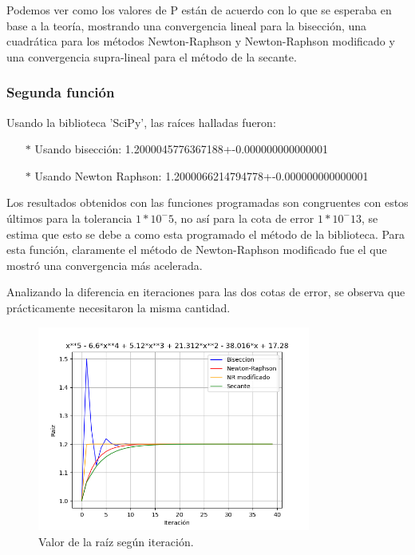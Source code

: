 \documentclass[titlepage,a4paper]{article}
\begin{document}
Podemos ver como los valores de P están de acuerdo con lo que se esperaba en base a la teoría, mostrando una convergencia lineal para la bisección, una cuadrática para los métodos Newton-Raphson y Newton-Raphson modificado y una convergencia supra-lineal para el método de la secante.

\subsubsection{Segunda función}\label{sec:CR2}

Usando la biblioteca 'SciPy', las raíces halladas fueron:
\begin{itemize}
    \item[$*$]Usando bisección:   1.2000045776367188+-0.000000000000001
    \item[$*$]Usando Newton Raphson:  1.2000066214794778+-0.000000000000001
\end{itemize}

Los resultados obtenidos con las funciones programadas son congruentes con estos últimos para la tolerancia $1*10^-5$, no así para la cota de error $1*10^-13$, se estima que esto se debe a como esta programado el método de la biblioteca. Para esta función, claramente el método de Newton-Raphson modificado fue el que mostró una convergencia más acelerada. 

Analizando la diferencia en iteraciones para las dos cotas de error, se observa que prácticamente necesitaron la misma cantidad.
\begin{figure}[H]
    \centering
    \includegraphics[width=0.8\textwidth]{raiz f2.png}
    \caption{\label{fig:raizf2}Valor de la raíz según iteración.}
\end{figure}
\end{document}
